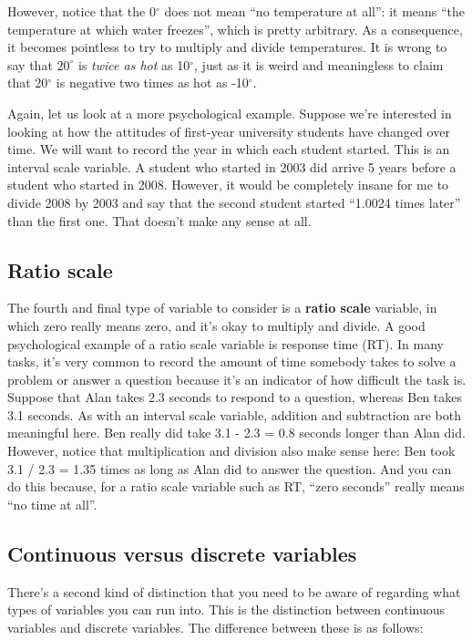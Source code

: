 \documentclass[
]{book}
\theoremstyle{definition}
\theoremstyle{definition}
\theoremstyle{definition}
\theoremstyle{definition}
\theoremstyle{remark}
\begin{document}
However, notice that the 0\(^\circ\) does not mean ``no temperature at all'': it means ``the temperature at which water freezes'', which is pretty arbitrary. As a consequence, it becomes pointless to try to multiply and divide temperatures. It is wrong to say that \(20^\circ\) is \emph{twice as hot} as 10\(^\circ\), just as it is weird and meaningless to claim that 20\(^\circ\) is negative two times as hot as -10\(^\circ\).

Again, let us look at a more psychological example. Suppose we're interested in looking at how the attitudes of first-year university students have changed over time. We will want to record the year in which each student started. This is an interval scale variable. A student who started in 2003 did arrive 5 years before a student who started in 2008. However, it would be completely insane for me to divide 2008 by 2003 and say that the second student started ``1.0024 times later'' than the first one. That doesn't make any sense at all.

\hypertarget{ratioscale}{%
\subsection{Ratio scale}\label{ratioscale}}

The fourth and final type of variable to consider is a \textbf{ratio scale} variable, in which zero really means zero, and it's okay to multiply and divide. A good psychological example of a ratio scale variable is response time (RT). In many tasks, it's very common to record the amount of time somebody takes to solve a problem or answer a question because it's an indicator of how difficult the task is. Suppose that Alan takes 2.3 seconds to respond to a question, whereas Ben takes 3.1 seconds. As with an interval scale variable, addition and subtraction are both meaningful here. Ben really did take 3.1 - 2.3 = 0.8 seconds longer than Alan did. However, notice that multiplication and division also make sense here: Ben took 3.1 / 2.3 = 1.35 times as long as Alan did to answer the question. And you can do this because, for a ratio scale variable such as RT, ``zero seconds'' really means ``no time at all''.

\hypertarget{continuousdiscrete}{%
\subsection{Continuous versus discrete variables}\label{continuousdiscrete}}

There's a second kind of distinction that you need to be aware of regarding what types of variables you can run into. This is the distinction between continuous variables and discrete variables. The difference between these is as follows:
\end{document}
